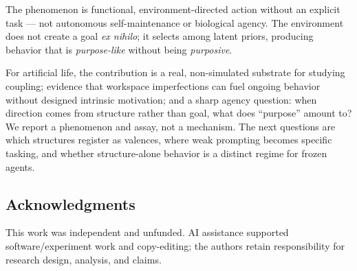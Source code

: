 \documentclass[letterpaper]{article}
\begin{document}
The phenomenon is functional, environment-directed action without an
explicit task --- not autonomous self-maintenance or biological agency.
The environment does not create a goal \emph{ex nihilo}; it selects
among latent priors, producing behavior that is \emph{purpose-like}
without being \emph{purposive}.

For artificial life, the contribution is a real, non-simulated substrate
for studying coupling; evidence that workspace imperfections can fuel
ongoing behavior without designed intrinsic motivation; and a sharp
agency question: when direction comes from structure rather than goal,
what does ``purpose'' amount to? We report a phenomenon and assay, not a
mechanism. The next questions are which structures register as valences,
where weak prompting becomes specific tasking, and whether
structure-alone behavior is a distinct regime for frozen agents.

\subsection{Acknowledgments}\label{acknowledgments}

This work was independent and unfunded. AI assistance supported
software/experiment work and copy-editing; the authors retain
responsibility for research design, analysis, and claims.

\footnotesize

\end{document}
